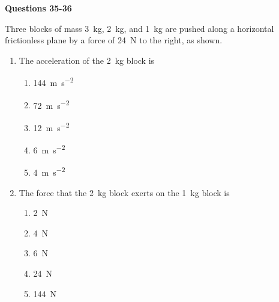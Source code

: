 \documentclass{../../oss-apphys}
\begin{document}
\begin{multicols}{2}
\begin{enumerate}[resume,leftmargin=18pt]
  \end{enumerate}
  
  \textbf{Questions 35-36}

  Three blocks of mass \SI{3}{\kilo\gram}, \SI{2}{\kilo\gram}, and
  \SI{1}{\kilo\gram} are pushed along a horizontal frictionless plane by a
  force of \SI{24}{\newton} to the right, as shown.
  \begin{center}
  \end{center}
  \begin{enumerate}[resume,leftmargin=18pt]
  \item The acceleration of the \SI{2}{\kilo\gram} block is
    \begin{enumerate}[noitemsep,topsep=0pt,leftmargin=18pt,label=(\Alph*)]
    \item\SI{144}{\metre\per\second^2}
    \item\SI{72 }{\metre\per\second^2}
    \item\SI{12 }{\metre\per\second^2}
    \item\SI{6  }{\metre\per\second^2}
    \item\SI{4  }{\metre\per\second^2}
    \end{enumerate}

  \item The force that the \SI{2}{\kilo\gram} block exerts on the
    \SI{1}{\kilo\gram} block is
    \begin{enumerate}[noitemsep,topsep=0pt,leftmargin=18pt,label=(\Alph*)]
    \item \SI{2}{\newton}
    \item \SI{4}{\newton}
    \item \SI{6}{\newton}
    \item \SI{24}{\newton}
    \item \SI{144}{\newton}
    \end{enumerate}


\end{enumerate}
\end{multicols}
\end{document}
